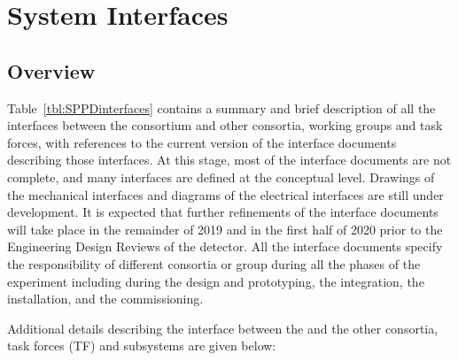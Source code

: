 \section{System Interfaces}
\label{sec:fdsp-pd-intfc}


\subsection{Overview}
Table~\ref{tbl:SPPDinterfaces} contains a summary and brief description of all the interfaces between the   consortium and other consortia, working groups and task forces, with references to the current version of the interface documents describing those interfaces.  At this stage, most of the interface documents are not complete, and many interfaces are defined at the conceptual level. Drawings of the mechanical interfaces and diagrams of the electrical interfaces are still under development. It is expected that further refinements of the interface documents will take place in the remainder of 2019 and in the first half of 2020 prior to the Engineering Design Reviews of the detector. All the interface documents specify the responsibility of different consortia or group during all the phases of the experiment including during the design and prototyping, the integration, the installation, and the commissioning.

Additional details describing the interface between the   and %
the other consortia, task forces (TF) and subsystems are given below:


